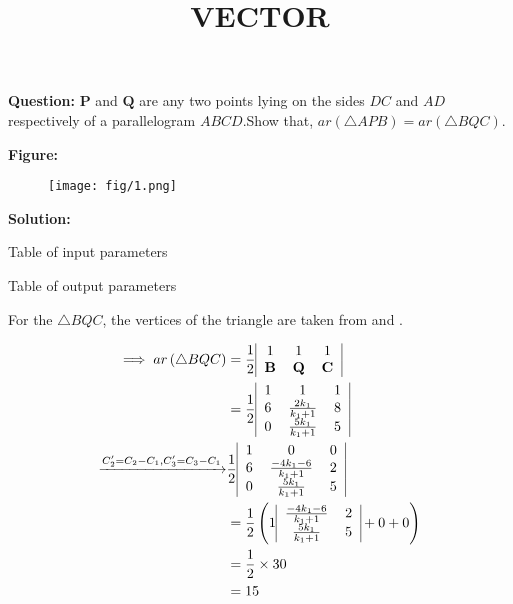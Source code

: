 \documentclass[12pt]{article}
\let\vec\mathbf
\providecommand{\brak}[1]{\ensuremath{\left(#1\right)}}
\begin{document}
\title{\textbf{VECTOR}}
\date{}
\maketitle
\textbf{Question:} $\vec{P}$ and $\vec{Q}$ are any two points lying on the sides $DC$ and $AD$ respectively of a parallelogram $ABCD$.Show that, $ar\brak{\triangle APB}=ar\brak{\triangle BQC}$.


\textbf{Figure:}
\begin{figure}[H]
    \centering
   \texttt{[image: fig/1.png]}
    \caption{}
    \label{fig:fig:1}
\end{figure}


\textbf{Solution:}
\begin{table}[H]
   \centering
  
   \caption{Table of input parameters}        
\label{tab:tab:1}                    
\end{table}




\begin{table}[H]
    \centering                                  
                  
\caption{Table of output parameters}
\label{tab:tab:2}
 \end{table}


For the $\triangle BQC$, the vertices of the triangle are taken from  and .

\begin{align}
\implies ar\brak{\triangle BQC}&=
\frac{1}{2}\begin{tabular}{|c c c|}            
1 &1&1\\                      
$\vec{B}$&$\vec{Q}$&$\vec{C}$\\    
\end{tabular}\\
&= \frac{1}{2}\begin{tabular}{|c c c|}
       1 &1&1\\
       6&$\frac{2k_1}{k_1+1}$&8 \\
       0&$\frac{5k_1}{k_1+1}$&5
   \end{tabular}\\
  \xrightarrow{C_2'=C_2-C_1,C_3'=C_3-C_1}&\frac{1}{2} \begin{tabular}{|c c c|}
       1 &0&0\\
       6&$\frac{-4k_1-6}{k_1+1}$&2 \\
       0&$\frac{5k_1}{k_1+1}$&5
   \end{tabular}\\
&=\frac{1}{2}\brak{1\begin{tabular}{|c c|}
   $\frac{-4k_1-6}{k_1+1}$ &2  \\
   $\frac{5k_1}{k_1+1}$ & 5
\end{tabular} +0+0}\\
&=\frac{1}{2} \times30\\                          
&=15 \end{align}
\end{document}

